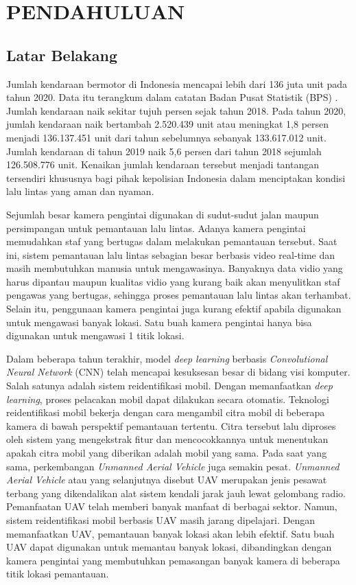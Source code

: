 \chapter{PENDAHULUAN}
\label{chap:pendahuluan}

\section{Latar Belakang}
\label{sec:latarbelakang}

Jumlah kendaraan bermotor di Indonesia mencapai lebih dari 136 juta unit pada tahun 2020. Data itu terangkum dalam catatan Badan Pusat Statistik (BPS) \cite{DataKendaraanBermotor}. Jumlah kendaraan naik sekitar tujuh persen sejak tahun 2018. Pada tahun 2020, jumlah kendaraan naik bertambah 2.520.439 unit atau meningkat 1,8 persen menjadi 136.137.451 unit dari tahun sebelumnya sebanyak 133.617.012 unit. Jumlah kendaraan di tahun 2019 naik 5,6 persen dari tahun 2018 sejumlah 126.508.776 unit. Kenaikan jumlah kendaraan tersebut menjadi tantangan tersendiri khususnya bagi pihak kepolisian Indonesia dalam menciptakan kondisi lalu lintas yang aman dan nyaman.

Sejumlah besar kamera pengintai digunakan di sudut-sudut jalan maupun persimpangan untuk pemantauan lalu lintas. Adanya kamera pengintai memudahkan staf yang bertugas dalam melakukan pemantauan tersebut. Saat ini, sistem pemantauan lalu lintas sebagian besar berbasis video real-time dan masih membutuhkan manusia untuk mengawasinya. Banyaknya data vidio yang harus dipantau maupun kualitas vidio yang kurang baik akan menyulitkan staf pengawas yang bertugas, sehingga proses pemantauan lalu lintas akan terhambat. Selain itu, penggunaan kamera pengintai juga kurang efektif apabila digunakan untuk mengawasi banyak lokasi. Satu buah kamera pengintai hanya bisa digunakan untuk mengawasi 1 titik lokasi.

Dalam beberapa tahun terakhir, model \emph{deep learning} berbasis \emph{Convolutional Neural Network} (CNN) telah mencapai kesuksesan besar di bidang visi komputer. Salah satunya adalah sistem reidentifikasi mobil. Dengan memanfaatkan \emph{deep learning}, proses pelacakan mobil dapat dilakukan secara otomatis. Teknologi reidentifikasi mobil bekerja dengan cara mengambil citra mobil di beberapa kamera di bawah perspektif pemantauan tertentu. Citra tersebut lalu diproses oleh sistem yang mengekstrak fitur dan mencocokkannya untuk menentukan apakah citra mobil yang diberikan adalah mobil yang sama. Pada saat yang sama, perkembangan \emph{Unmanned Aerial Vehicle} juga semakin pesat. \emph{Unmanned Aerial Vehicle} atau yang selanjutnya disebut UAV merupakan jenis pesawat terbang yang dikendalikan alat sistem kendali jarak jauh lewat gelombang radio. Pemanfaatan UAV telah memberi banyak manfaat di berbagai sektor. Namun, sistem reidentifikasi mobil berbasis UAV masih jarang dipelajari. Dengan memanfaatkan UAV, pemantauan banyak lokasi akan lebih efektif. Satu buah UAV dapat digunakan untuk memantau banyak lokasi, dibandingkan dengan kamera pengintai yang membutuhkan pemasangan banyak kamera di beberapa titik lokasi pemantauan.

